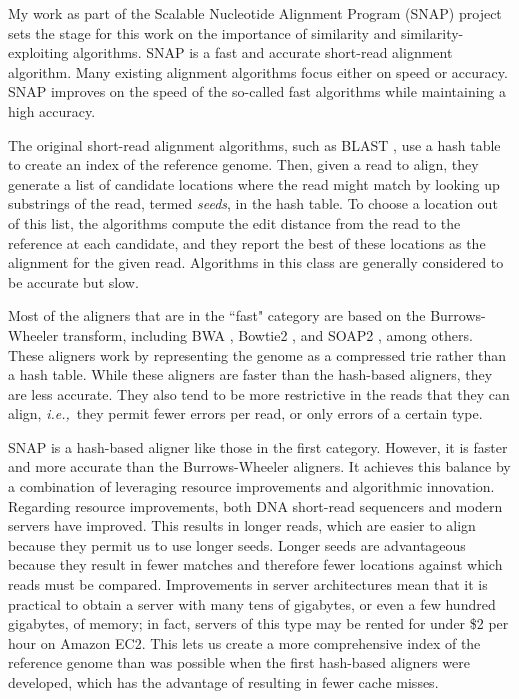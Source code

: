 \documentclass[twocolumn,10pt]{article}
\newcommand{\ie}{{\em i.e.,}~}
\begin{document}
My work as part of the Scalable Nucleotide Alignment Program (SNAP) project \cite{Zaharia:2011} sets the stage for this work on the importance of similarity and similarity-exploiting algorithms.  SNAP is a fast and accurate short-read alignment algorithm.  Many existing alignment algorithms focus either on speed or accuracy.  SNAP improves on the speed of the so-called fast algorithms while maintaining a high accuracy.

The original short-read alignment algorithms, such as BLAST \cite{Altschul:1990}, use a hash table to create an index of the reference genome.  Then, given a read to align, they generate a list of candidate locations where the read might match by looking up substrings of the read, termed \textit{seeds}, in the hash table.  To choose a location out of this list, the algorithms compute the edit distance from the read to the reference at each candidate, and they report the best of these locations as the alignment for the given read.  Algorithms in this class are generally considered to be accurate but slow.

Most of the aligners that are in the ``fast" category are based on the Burrows-Wheeler transform, including BWA \cite{Li:2009}, Bowtie2 \cite{Langmead:2012}, and SOAP2 \cite{RLi:2009}, among others.  These aligners work by representing the genome as a compressed trie rather than a hash table.  While these aligners are faster than the hash-based aligners, they are less accurate.  They also tend to be more restrictive in the reads that they can align, \ie they permit fewer errors per read, or only errors of a certain type.

SNAP is a hash-based aligner like those in the first category.  However, it is faster and more accurate than the Burrows-Wheeler aligners.  It achieves this balance by a combination of leveraging resource improvements and algorithmic innovation.  Regarding resource improvements, both DNA short-read sequencers and modern servers have improved.  This results in longer reads, which are easier to align because they permit us to use longer seeds.  Longer seeds are advantageous because they result in fewer matches and therefore fewer locations against which reads must be compared.  Improvements in server architectures mean that it is practical to obtain a server with many tens of gigabytes, or even a few hundred gigabytes, of memory; in fact, servers of this type may be rented for under \$2 per hour on Amazon EC2.  This lets us create a more comprehensive index of the reference genome than was possible when the first hash-based aligners were developed, which has the advantage of resulting in fewer cache misses.
\end{document}
